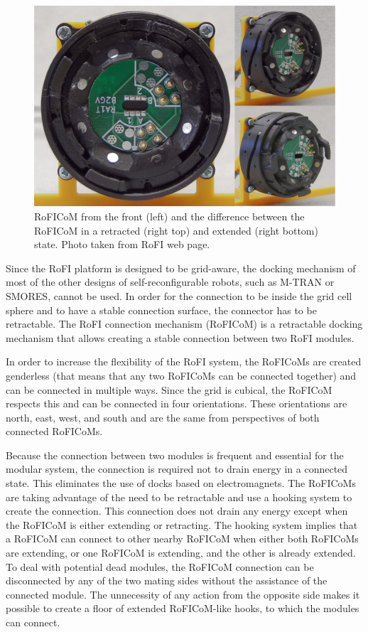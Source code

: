 \documentclass[
  printed, %
  color,   %
  notable, %
  oneside, %
  nolof,   %
  nolot,   %
  nocover,
]{fithesis3}
\begin{document}
\begin{figure}
    \centering
    \includegraphics[width=\linewidth]{data/connector.jpg}
    \caption{RoFICoM from the front (left) and the difference between the RoFICoM in a retracted (right top) and extended (right bottom) state. Photo taken from RoFI web page\cite{rofi-web}.}
    \label{fig:connector}
\end{figure}

Since the RoFI platform is designed to be grid-aware, the docking mechanism of most of the other designs of self-reconfigurable robots, such as M-TRAN\cite{mtran} or SMORES\cite{smores}, cannot be used.
In order for the connection to be inside the grid cell sphere and to have a stable connection surface, the connector has to be retractable.
The RoFI connection mechanism (RoFICoM) is a retractable docking mechanism that allows creating a stable connection between two RoFI modules.

In order to increase the flexibility of the RoFI system, the RoFICoMs are created genderless (that means that any two RoFICoMs can be connected together) and can be connected in multiple ways.
Since the grid is cubical, the RoFICoM respects this and can be connected in four orientations.
These orientations are north, east, west, and south and are the same from perspectives of both connected RoFICoMs.

Because the connection between two modules is frequent and essential for the modular system, the connection is required not to drain energy in a connected state.
This eliminates the use of docks based on electromagnets.
The RoFICoMs are taking advantage of the need to be retractable and use a hooking system to create the connection.
This connection does not drain any energy except when the RoFICoM is either extending or retracting.
The hooking system implies that a RoFICoM can connect to other nearby RoFICoM when either both RoFICoMs are extending, or one RoFICoM is extending, and the other is already extended.
To deal with potential dead modules, the RoFICoM connection can be disconnected by any of the two mating sides without the assistance of the connected module.
The unnecessity of any action from the opposite side makes it possible to create a floor of extended RoFICoM-like hooks, to which the modules can connect.
\end{document}
